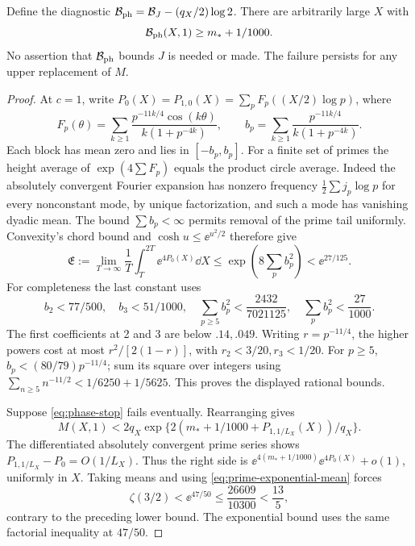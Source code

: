 \begin{theorem}\label{thm:phase-stop}
Define the diagnostic
\(\mathcal B_{\rm ph}=\mathcal B_J-(q_X/2)\log2\).
There are arbitrarily large \(X\) with
\begin{equation}\label{eq:phase-stop}
 \mathcal B_{\rm ph}(X,1)\ge m_*+1/1000.
\end{equation}
No assertion that \(\mathcal B_{\rm ph}\) bounds \(J\) is needed
or made. The failure persists for any upper replacement of \(M\).
\end{theorem}
\begin{proof}
At \(c=1\), write \(P_0(X)=P_{1,0}(X)=\sum_p F_p((X/2)\log p)\),
where
\[
 F_p(\theta)=\sum_{k\ge1}
    \frac{p^{-11k/4}\cos(k\theta)}{k(1+p^{-4k})},\qquad
 b_p=\sum_{k\ge1}\frac{p^{-11k/4}}{k(1+p^{-4k})}.
\]
Each block has mean zero and lies in \([-b_p,b_p]\).
For a finite set of primes the height average of \(\exp(4\sum F_p)\)
equals the product circle average. Indeed the absolutely convergent
Fourier expansion has nonzero frequency
\(\tfrac12\sum j_p\log p\) for every nonconstant mode, by unique
factorization, and such a mode has vanishing dyadic mean.
The bound \(\sum b_p<\infty\) permits removal of the prime tail
uniformly. Convexity's chord bound and \(\cosh u\le\ee^{u^2/2}\)
therefore give
\begin{equation}\label{eq:prime-exponential-mean}
 \mathfrak E:=\lim_{T\to\infty}\frac1T\int_T^{2T}\ee^{4P_0(X)}\dd X
 \le\exp\left(8\sum_p b_p^2\right)<\ee^{27/125}.
\end{equation}
For completeness the last constant uses
\[
 b_2<77/500,\quad b_3<51/1000,\quad
 \sum_{p\ge5}b_p^2<\frac{2432}{7021125},\quad
 \sum_p b_p^2<\frac{27}{1000}.
\]
The first coefficients at 2 and 3 are below \(.14,.049\).
Writing \(r=p^{-11/4}\), the higher powers cost at most
\(r^2/[2(1-r)]\), with \(r_2<3/20,r_3<1/20\).
For \(p\ge5\), \(b_p<(80/79)p^{-11/4}\); sum its square over
integers using
\(\sum_{n\ge5}n^{-11/2}<1/6250+1/5625\).
This proves the displayed rational bounds.

Suppose \eqref{eq:phase-stop} fails eventually. Rearranging gives
\[
 M(X,1)<2q_X\exp\{2(m_*+1/1000+P_{1,1/L_X}(X))/q_X\}.
\]
The differentiated absolutely convergent prime series shows
\(P_{1,1/L_X}-P_0=O(1/L_X)\). Thus the right side is
\(\ee^{4(m_*+1/1000)}\ee^{4P_0(X)}+o(1)\), uniformly in \(X\).
Taking means and using \eqref{eq:prime-exponential-mean} forces
\[
 \zeta(3/2)<\ee^{47/50}
       \le\frac{26609}{10300}<\frac{13}{5},
\]
contrary to the preceding lower bound. The exponential bound uses
the same factorial inequality at \(47/50\).
\end{proof}

